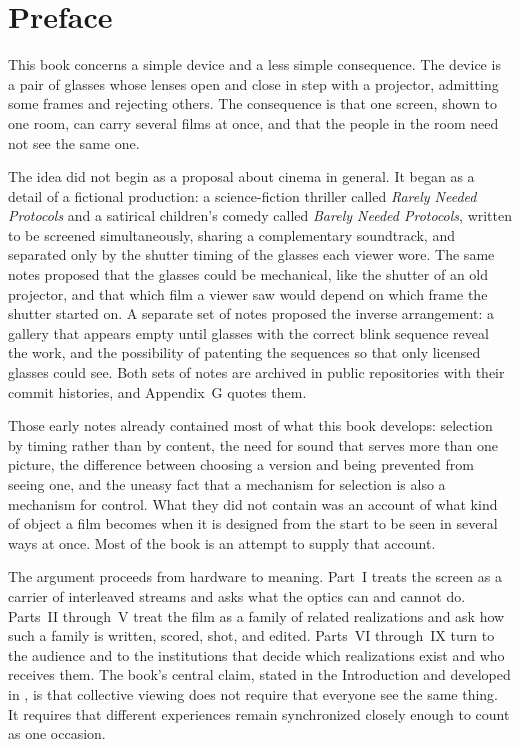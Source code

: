 \chapter*{Preface}

This book concerns a simple device and a less simple consequence. The device is a pair of glasses whose lenses open and close in step with a projector, admitting some frames and rejecting others. The consequence is that one screen, shown to one room, can carry several films at once, and that the people in the room need not see the same one.

The idea did not begin as a proposal about cinema in general. It began as a detail of a fictional production: a science-fiction thriller called \emph{Rarely Needed Protocols} and a satirical children's comedy called \emph{Barely Needed Protocols}, written to be screened simultaneously, sharing a complementary soundtrack, and separated only by the shutter timing of the glasses each viewer wore. The same notes proposed that the glasses could be mechanical, like the shutter of an old projector, and that which film a viewer saw would depend on which frame the shutter started on. A separate set of notes proposed the inverse arrangement: a gallery that appears empty until glasses with the correct blink sequence reveal the work, and the possibility of patenting the sequences so that only licensed glasses could see. Both sets of notes are archived in public repositories with their commit histories, and Appendix~G quotes them.

Those early notes already contained most of what this book develops: selection by timing rather than by content, the need for sound that serves more than one picture, the difference between choosing a version and being prevented from seeing one, and the uneasy fact that a mechanism for selection is also a mechanism for control. What they did not contain was an account of what kind of object a film becomes when it is designed from the start to be seen in several ways at once. Most of the book is an attempt to supply that account.

The argument proceeds from hardware to meaning. Part~I treats the screen as a carrier of interleaved streams and asks what the optics can and cannot do. Parts~II through~V treat the film as a family of related realizations and ask how such a family is written, scored, shot, and edited. Parts~VI through~IX turn to the audience and to the institutions that decide which realizations exist and who receives them. The book's central claim, stated in the Introduction and developed in , is that collective viewing does not require that everyone see the same thing. It requires that different experiences remain synchronized closely enough to count as one occasion.
